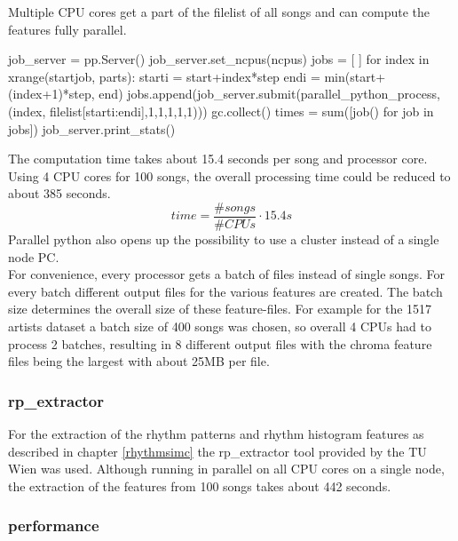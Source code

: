 Multiple CPU cores get a part of the filelist of all songs and can compute the features fully parallel.
\begin{pythonCode}
job_server = pp.Server()
job_server.set_ncpus(ncpus)
jobs = [ ]
for index in xrange(startjob, parts):
	starti = start+index*step
	endi = min(start+(index+1)*step, end)
	jobs.append(job_server.submit(parallel_python_process, (index, filelist[starti:endi],1,1,1,1,1)))
	gc.collect()
times = sum([job() for job in jobs])
job_server.print_stats()
\end{pythonCode}
The computation time takes about 15.4 seconds per song and processor core. Using 4 CPU cores for 100 songs, the overall processing time could be reduced to about 385 seconds. 
\begin{equation} \label{eq:parallelp}
time = \frac{\#songs}{\#CPUs} \cdot 15.4s
\end{equation}
Parallel python also opens up the possibility to use a cluster instead of a single node PC.\\
For convenience, every processor gets a batch of files instead of single songs. For every batch different output files for the various features are created. The batch size determines the overall size of these feature-files. For example for the 1517 artists dataset a batch size of 400 songs was chosen, so overall 4 CPUs had to process 2 batches, resulting in 8 different output files with the chroma feature files being the largest with about 25MB per file.

\subsubsection{rp\_extractor}

For the extraction of the rhythm patterns and rhythm histogram features as described in chapter \ref{rhythmsimc} the rp\_extractor tool provided by the TU Wien was used. Although running in parallel on all CPU cores on a single node, the extraction of the features from 100 songs takes about 442 seconds.

\subsubsection{performance}

